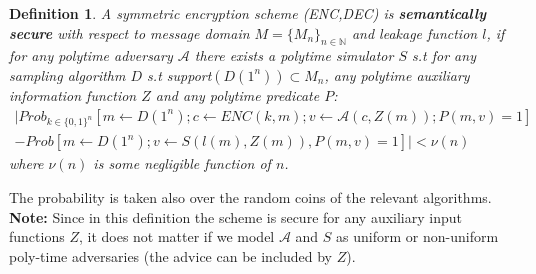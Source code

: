 \documentclass[12pt]{article}
\newcommand{\adv}{\mathcal{A}}
\newcommand{\pr}{Prob}
\newtheorem{definition}{Definition}[section]
\begin{document}
\begin{definition} A symmetric encryption scheme (\textit{ENC,DEC)} is \textbf{semantically secure} with respect to message domain $M = \{M_n\}_{n\in \mathbb{N}}$ and leakage function $l$, if for any polytime adversary $\adv$ there exists a polytime simulator $S$ s.t for any sampling algorithm $D$ s.t support$(D(1^n)) \subset M_n$, any polytime auxiliary information function $Z$ and any polytime
predicate $P$:
\begin{align*} |\pr_{k \in \{0,1\}^n}[m \leftarrow D(1^n); c \leftarrow ENC(k,m); v \leftarrow \adv(c,Z(m)); P(m, v) = 1]\\ - \pr[m \leftarrow D(1^n); v \leftarrow S(l(m),Z(m)),P(m,v)=1]| < \nu(n)
\end{align*}
where $\nu(n)$ is some negligible function of $n$.
\end{definition}
The probability is taken also over the random coins of the relevant algorithms.\\
\textbf{Note:}  Since in this definition the scheme is secure for any auxiliary input functions $Z$, it does not matter if we model $\adv$ and $S$ as uniform or non-uniform poly-time adversaries (the advice can be included by $Z$).
\end{document}
